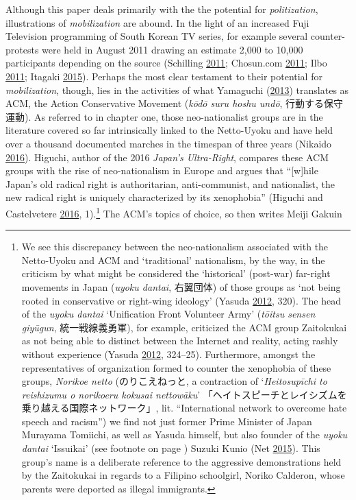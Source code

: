 \documentclass[10pt,british,A4paper,,openany]{memoir}
\makeatletter
\newcommand\footnoteref[1]{\protected@xdef\@thefnmark{\ref{#1}}\@footnotemark}
\makeatother
\begin{document}
Although this paper deals primarily with the the potential for
\emph{politization}, illustrations of \emph{mobilization} are abound. In
the light of an increased Fuji Television programming of South Korean TV
series, for example several counter-protests were held in August 2011
drawing an estimate 2,000 to 10,000 participants depending on the source
(Schilling \protect\hyperlink{ref-schilling_japanese_2011}{2011};
Chosun.com \protect\hyperlink{ref-chosun.com_japanese_2011}{2011}; Ilbo
\protect\hyperlink{ref-the_donga_ilbo_japans_2011}{2011}; Itagaki
\protect\hyperlink{ref-itagaki_anatomy_2015}{2015}). Perhaps the most
clear testament to their potential for \emph{mobilization}, though, lies
in the activities of what Yamaguchi
(\protect\hyperlink{ref-yamaguchi_xenophobia_2013}{2013}) translates as
ACM, the Action Conservative Movement (\emph{kōdō suru hoshu undō},
行動する保守運動). As referred to in chapter one, those neo-nationalist
groups are in the literature covered so far intrinsically linked to the
Netto-Uyoku and have held over a thousand documented marches in the
timespan of three years (Nikaido
\protect\hyperlink{ref-nikaido_eng:_2016}{2016}). Higuchi, author of the
2016 \emph{Japan's Ultra-Right}, compares these ACM groups with the rise
of neo-nationalism in Europe and argues that ``{[}w{]}hile Japan's old
radical right is authoritarian, anti-communist, and nationalist, the new
radical right is uniquely characterized by its xenophobia'' (Higuchi and
Castelvetere \protect\hyperlink{ref-higuchi_japans_2016}{2016},
1).\footnote{We see this discrepancy between the neo-nationalism
  associated with the Netto-Uyoku and ACM and `traditional' nationalism,
  by the way, in the criticism by what might be considered the
  `historical' (post-war) far-right movements in Japan (\emph{uyoku
  dantai}, 右翼団体) of those groups as `not being rooted in
  conservative or right-wing ideology' (Yasuda
  \protect\hyperlink{ref-yasuda_eng:_2012}{2012}, 320). The head of the
  \emph{uyoku dantai} `Unification Front Volunteer Army' (\emph{tōitsu
  sensen giyūgun}, 統一戦線義勇軍), for example, criticized the ACM
  group Zaitokukai as not being able to distinct between the Internet
  and reality, acting rashly without experience (Yasuda
  \protect\hyperlink{ref-yasuda_eng:_2012}{2012}, 324--25). Furthermore,
  amongst the representatives of organization formed to counter the
  xenophobia of these groups, \emph{Norikoe netto} (のりこえねっと, a
  contraction of `\emph{Heitosupīchi to reishizumu o norikoeru kokusai
  nettowāku}'
  「ヘイトスピーチとレイシズムを乗り越える国際ネットワーク」, lit.
  ``International network to overcome hate speech and racism'') we find
  not just former Prime Minister of Japan Murayama Tomiichi, as well as
  Yasuda himself, but also founder of the \emph{uyoku dantai} `Issuikai'
  (see footnote \footnoteref{issuikai} on page \pageref{issuikai})
  Suzuki Kunio (Net \protect\hyperlink{ref-net_norikoe_2015}{2015}).
  This group's name is a deliberate reference to the aggressive
  demonstrations held by the Zaitokukai in regards to a Filipino
  schoolgirl, Noriko Calderon, whose parents were deported as illegal
  immigrants.} The ACM's topics of choice, so then writes Meiji Gakuin
\end{document}
